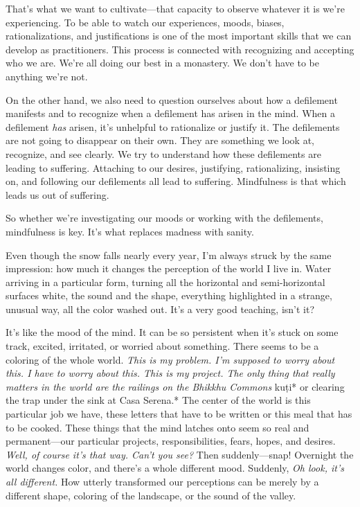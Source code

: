 That's what we want to cultivate---that capacity to observe whatever it 
is we're experiencing. To be able to watch our experiences, moods, 
biases, rationalizations, and justifications is one of the most 
important skills that we can develop as practitioners. This process is 
connected with recognizing and accepting who we are. We're all doing 
our best in a monastery. We don't have to be anything we're not.

On the other hand, we also need to question ourselves about how a 
defilement manifests and to recognize when a defilement has arisen in 
the mind. When a defilement \emph{has} arisen, it's unhelpful to 
rationalize or justify it. The defilements are not going to disappear 
on their own. They are something we look at, recognize, and see 
clearly. We try to understand how these defilements are leading to 
suffering. Attaching to our desires, justifying, rationalizing, 
insisting on, and following our defilements all lead to suffering. 
Mindfulness is that which leads us out of suffering.

So whether we're investigating our moods or working with the 
defilements, mindfulness is key. It's what replaces madness with sanity.


Even though the snow falls nearly every year, I'm always struck by the 
same impression: how much it changes the perception of the world I live 
in. Water arriving in a particular form, turning all the horizontal and 
semi-horizontal surfaces white, the sound and the shape, everything 
highlighted in a strange, unusual way, all the color washed out. It's a 
very good teaching, isn't it?

It's like the mood of the mind. It can be so persistent when it's stuck 
on some track, excited, irritated, or worried about something. There 
seems to be a coloring of the whole world. \emph{This is my problem. 
I'm supposed to worry about this. I have to worry about this. This is 
my project. The only thing that really matters in the world are the 
railings on the Bhikkhu Commons }kuṭi* or clearing the trap under the 
sink at Casa Serena.* The center of the world is this particular job we 
have, these letters that have to be written or this meal that has to be 
cooked. These things that the mind latches onto seem so real and 
permanent---our particular projects, responsibilities, fears, hopes, 
and desires. \emph{Well, of course it's that way. Can't you see?} Then 
suddenly---snap! Overnight the world changes color, and there's a whole 
different mood. Suddenly, \emph{Oh look, it's all different.} How 
utterly transformed our perceptions can be merely by a different shape, 
coloring of the landscape, or the sound of the valley.

